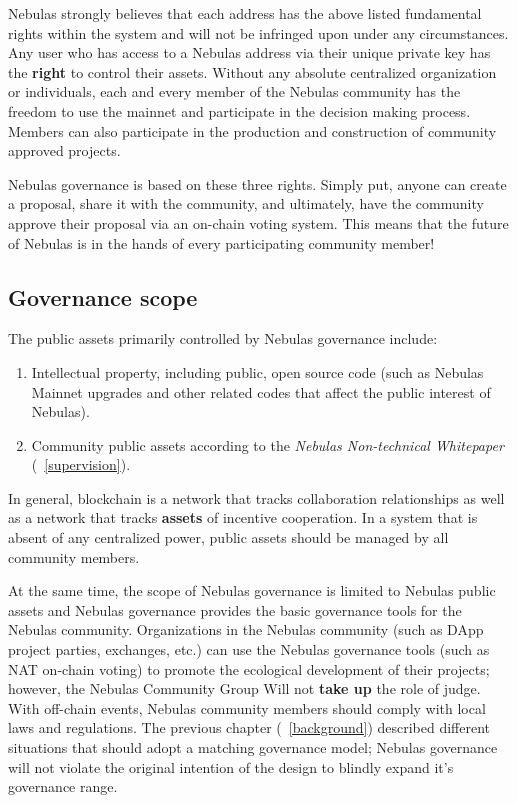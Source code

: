 Nebulas strongly believes that each address has the above listed fundamental rights within the system and will not be infringed upon under any circumstances. Any user who has access to a Nebulas address via their unique private key has the \textbf{right} to control their assets. Without any absolute centralized organization or individuals, each and every member of the Nebulas community has the freedom to use the mainnet and participate in the decision making process. Members can also participate in the production and construction of community approved projects. 

Nebulas governance is based on these three rights. Simply put, anyone can create a proposal, share it with the community, and ultimately, have the community approve their proposal via an on-chain voting system. This means that the future of Nebulas is in the hands of every participating community member!

\subsection{Governance scope}


The public assets primarily controlled by Nebulas governance include:

\begin{enumerate}
	\item Intellectual property, including public, open source code (such as Nebulas Mainnet upgrades and other related codes that affect the public interest of Nebulas).
	\item Community public assets according to the \textit{Nebulas Non-technical Whitepaper} (~\ref{supervision}).
\end{enumerate}

In general, blockchain is a network that tracks collaboration relationships as well as a network that tracks \textbf{assets} of incentive cooperation. In a system that is absent of any centralized power, public assets should be managed by all community members.

At the same time, the scope of Nebulas governance is limited to Nebulas public assets and Nebulas governance provides the basic governance tools for the Nebulas community. Organizations in the Nebulas community (such as DApp project parties, exchanges, etc.) can use the Nebulas governance tools (such as NAT on-chain voting) to promote the ecological development of their projects; however, the Nebulas Community Group Will not \textbf{take up} the role of judge. With off-chain events, Nebulas community members should comply with local laws and regulations. The previous chapter (~\ref{background}) described different situations that should adopt a matching governance model; Nebulas governance will not violate the original intention of the design to blindly expand it's governance range.

